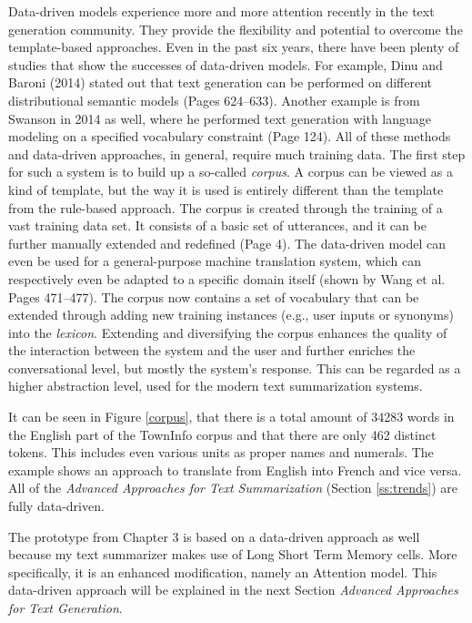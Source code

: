 Data-driven models experience more and more attention recently in the text generation community. They provide the flexibility and potential to overcome the template-based approaches. Even in the past six years, there have been plenty of studies that show the successes of data-driven models. For example, Dinu and Baroni (2014) stated out that text generation can be performed on different distributional semantic models \cite{dinu-baroni-2014-make} (Pages 624–633). Another example is from Swanson in 2014 as well, where he performed text generation with language modeling on a specified vocabulary constraint \cite{swanson-etal-2014-natural} (Page 124). All of these methods and data-driven approaches, in general, require much training data. The first step for such a system is to build up a so-called \textit{corpus}. A corpus can be viewed as a kind of template, but the way it is used is entirely different than the template from the rule-based approach. The corpus is created through the training of a vast training data set. It consists of a basic set of utterances, and it can be further manually extended and redefined \cite{elena} (Page 4). The data-driven model can even be used for a general-purpose machine translation system, which can respectively even be adapted to a specific domain itself (shown by Wang et al. \cite{wang-hirst-2009-extracting} Pages 471–477). The corpus now contains a set of vocabulary that can be extended through adding new training instances (e.g., user inputs or synonyms) into the \textit{lexicon}. 
Extending and diversifying the corpus enhances the quality of the interaction between the system and the user and further enriches the conversational level, but mostly the system's response. This can be regarded as a higher abstraction level, used for the modern text summarization systems. 

It can be seen in Figure \ref{corpus}, that there is a total amount of 34283 words in the English part of the TownInfo corpus and that there are only 462 distinct tokens. This includes even various units as proper names and numerals. The example shows an approach to translate from English into French and vice versa. All of the \textit{Advanced Approaches for Text Summarization} (Section \ref{ss:trends}) are fully data-driven. 

The prototype from Chapter 3 is based on a data-driven approach as well because my text summarizer makes use of Long Short Term Memory cells. More specifically, it is an enhanced modification, namely an Attention model. This data-driven approach will be explained in the next Section \textit{Advanced Approaches for Text Generation}.

